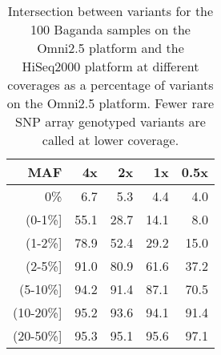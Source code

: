\begin{table}[htp]
\centering
\begin{tabular}{r|rrrr}
{\gls{MAF}} & {4x} & {2x} & {1x} & {0.5x} \\ \hline
0\%                        & 6.7                       & 5.3                       & 4.4                       & 4.0                         \\
(0-1\%{]}                  & 55.1                      & 28.7                      & 14.1                      & 8.0                         \\
(1-2\%{]}                  & 78.9                      & 52.4                      & 29.2                      & 15.0                        \\
(2-5\%{]}                  & 91.0                      & 80.9                      & 61.6                      & 37.2                        \\
(5-10\%{]}                 & 94.2                      & 91.4                      & 87.1                      & 70.5                        \\
(10-20\%{]}                & 95.2                      & 93.6                      & 94.1                      & 91.4                        \\
(20-50\%{]}                & 95.3                      & 95.1                      & 95.6                      & 97.1 \\ \hline
\end{tabular}
\caption{Intersection between variants for the 100 Baganda samples on the Omni2.5 platform and the HiSeq2000 platform at different coverages as a percentage of variants on the Omni2.5 platform. Fewer rare SNP array genotyped variants are called at lower coverage.}
\label{tab:downsampling_omni_intersection}
\end{table}